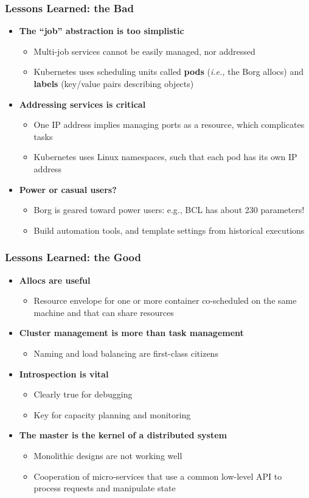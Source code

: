 \begin{frame}\frametitle{Lessons Learned: the Bad}
\begin{itemize}
	\item {\bf The ``job'' abstraction is too simplistic}
	\begin{itemize}
		\item Multi-job services cannot be easily managed, nor addressed
		\item Kubernetes uses scheduling units called {\bf pods} ({\it i.e.,} the Borg allocs) and {\bf labels} (key/value pairs describing objects)
	\end{itemize}
	\item {\bf Addressing services is critical}
	\begin{itemize}
		\item One IP address implies managing ports as a resource, which complicates tasks
		\item Kubernetes uses Linux namespaces, such that each pod has its own IP address
	\end{itemize}
	\item {\bf Power or casual users?}
	\begin{itemize}
		\item Borg is geared toward power users: e.g., BCL has about 230 parameters!
		\item Build automation tools, and template settings from historical executions
	\end{itemize}
\end{itemize}
\end{frame}

\begin{frame}\frametitle{Lessons Learned: the Good}
\begin{itemize}
	\item {\bf Allocs are useful}
	\begin{itemize}
		\item Resource envelope for one or more container co-scheduled on the same machine and that can share resources
	\end{itemize}
	\item {\bf Cluster management is more than task management}
	\begin{itemize}
		\item Naming and load balancing are first-class citizens
	\end{itemize}
	\item {\bf Introspection is vital}
	\begin{itemize}
		\item Clearly true for debugging
		\item Key for capacity planning and monitoring
	\end{itemize}
	\item {\bf The master is the kernel of a distributed system}
	\begin{itemize}
		\item Monolithic designs are not working well
		\item Cooperation of micro-services that use a common low-level API to process requests and manipulate state
	\end{itemize}
\end{itemize}
\end{frame}
